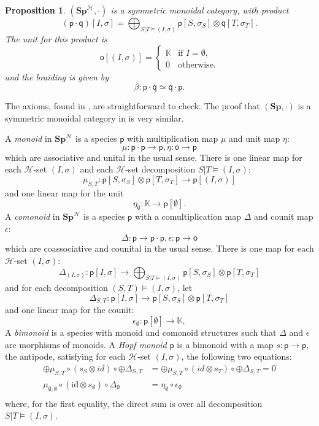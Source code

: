 \documentclass[11pt,reqno]{amsart}
\numberwithin{equation}{section}
\newtheorem{prop}[theorem]{Proposition}
\def\K{{\mathbb K}}
\def\Sp{{\mathbf{Sp}}}
\def\SpB{{\mathbf{Sp}^{\H}}}
\def\H{{\mathcal{H}}}
\def\p{{\textsf{p}}}
\def\q{{\textsf{q}}}
\def\o{{\textsf{o}}}
\def\Is{(I,\sigma )}
\def\Ss{S,\sigma_S}
\def\Ts{T,\sigma_T}
\def\id{\mathrm{id}}
\begin{document}
\begin{prop}
$(\SpB,\cdot)$ is a symmetric monoidal category, with product
\begin{equation}
(\p\cdot \q)[I,\sigma]=\bigoplus_{S|T\models (I,\sigma)} \p[\Ss]\otimes \q[\Ts].
\end{equation}
The unit for this product is
\begin{equation*} \o[(I,\sigma)]=\begin{cases} \K & \text{if $I=\emptyset$,}\\ 0 & \text{otherwise.}\end{cases}\end{equation*}
and the braiding is given by
$$\beta:\p\cdot\q\simeq \q\cdot\p.$$
\end{prop}

The axioms, found in \cite{Mac}, are straightforward to check. The proof that $(\Sp,\cdot)$ is a symmetric monoidal category in \cite{Aguiar} is very similar.


A {\it monoid} in $\SpB$ is a species $\p$ with multiplication map $\mu$ and unit map $\eta$:
$$\mu:\p\cdot\p\rightarrow \p, \eta:\o\rightarrow \p$$
which are associative and unital in the usual sense. There is one linear map for each $\H$-set $(I,\sigma)$ and each $\H$-set decomposition $S|T \models \Is$:
$$\mu_{S,T}:\p[\Ss]\otimes\p[\Ts]\rightarrow \p[\Is]$$
and one linear map for the unit
$$\eta_{\emptyset}:\K\rightarrow \p[\emptyset].$$
A {\it comonoid} in $\SpB$ is a species $\p$ with a comultiplication map $\Delta$ and counit map $\epsilon$:
$$\Delta:\p\rightarrow \p\cdot \p, \epsilon :\p\rightarrow \o$$
which are coassociative and counital in the usual sense. There is one map for each $\H$-set $\Is$:
$$\Delta_{(I,\sigma)}\colon \p[I,\sigma]\rightarrow \bigoplus_{S|T\models \Is} \p[\Ss]\otimes\p[\Ts]$$
and for each decomposition $(S,T)\models \Is$, let
$$\Delta_{S,T}\colon \p[I,\sigma]\rightarrow \p[\Ss]\otimes\p[\Ts]$$
and one linear map for the counit:
$$\epsilon_{\emptyset}:\p[\emptyset]\rightarrow \K,$$
A {\it bimonoid} is a species with monoid and comonoid structures such that $\Delta$ and $\epsilon$ are morphisms of monoids. A {\it Hopf monoid} $\p$ is a bimonoid with a map $s:\p\rightarrow \p$, the antipode, satisfying for each $\H$-set $(I,\sigma)$, the following two equations:
\begin{equation}
\begin{aligned}
\oplus\mu_{S,T}\circ (s_S\otimes id)\circ \oplus\Delta_{S,T}&=\oplus\mu_{S,T}\circ (id\otimes s_T)\circ \oplus\Delta_{S,T} =0\\
\mu_{\emptyset,\emptyset}\circ(\id \otimes s_{\emptyset})\circ \Delta_{\emptyset}&=\eta_{\emptyset}\circ\epsilon_{\emptyset}\\
\end{aligned}
\end{equation}
where, for the first equality, the direct sum is over all decomposition $S|T\models \Is$.
\end{document}
